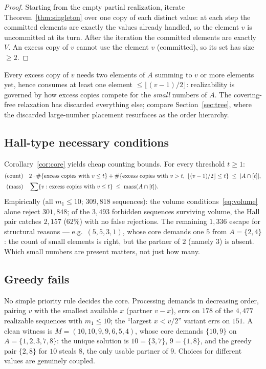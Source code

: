 \documentclass[11pt]{article}
\theoremstyle{definition}
\theoremstyle{remark}
\newcommand{\mass}{\operatorname{mass}}
\newcommand{\intv}[1]{[#1]}
\begin{document}
\begin{proof}
Starting from the empty partial realization, iterate Theorem~\ref{thm:singleton} over
one copy of each distinct value: at each step the committed elements are exactly the
values already handled, so the element $v$ is uncommitted at its turn. After the
iteration the committed elements are exactly $V$. An excess copy of $v$ cannot use
the element $v$ (committed), so its set has size $\ge2$.
\end{proof}

Every excess copy of $v$ needs two elements of $A$ summing to $v$ or more elements
yet, hence consumes at least one element $\le\lfloor(v-1)/2\rfloor$: realizability is
governed by how excess copies compete for the \emph{small} numbers of $A$. The
covering-free relaxation has discarded everything else; compare
Section~\ref{sec:tree}, where the discarded large-number placement resurfaces as the
order hierarchy.

\subsection{Hall-type necessary conditions}\label{subsec:hall}

Corollary~\ref{cor:core} yields cheap counting bounds. For every threshold $t\ge1$:
\begin{align}
\text{(count)}\quad
&2\cdot\#\{\text{excess copies with } v\le t\}
+\#\{\text{excess copies with } v>t,\ \lfloor(v-1)/2\rfloor\le t\}
\;\le\; |A\cap\intv{t}|,\notag\\
\text{(mass)}\quad
&\sum\{v : \text{excess copies with } v\le t\} \;\le\; \mass(A\cap\intv{t}).\notag
\end{align}
Empirically (all $m_1\le10$; $309{,}818$ sequences): the volume
conditions~\eqref{eq:volume} alone reject $301{,}848$; of the $3{,}493$ forbidden
sequences surviving volume, the Hall pair catches $2{,}157$ ($62\%$) with no false
rejections. The remaining $1{,}336$ escape for structural reasons --- e.g.\
$(5,5,3,1)$, whose core demands one $5$ from $A=\{2,4\}$: the count of small
elements is right, but the partner of $2$ (namely $3$) is absent. Which small
numbers are present matters, not just how many.

\subsection{Greedy fails}\label{subsec:greedy}

No simple priority rule decides the core. Processing demands in decreasing order,
pairing $v$ with the smallest available $x$ (partner $v-x$), errs on $178$ of the
$4{,}477$ realizable sequences with $m_1\le10$; the ``largest $x<v/2$'' variant errs
on $151$. A clean witness is $M=(10,10,9,9,6,5,4)$, whose core demands $\{10,9\}$ on
$A=\{1,2,3,7,8\}$: the unique solution is $10=\{3,7\}$, $9=\{1,8\}$, and the greedy
pair $\{2,8\}$ for $10$ steals $8$, the only usable partner of $9$. Choices for
different values are genuinely coupled.
\end{document}
